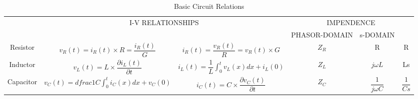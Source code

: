  \begin{table}[h]
	
	\begin{center}
			\begin{tabular}{cccccc}
				\toprule 
				\multirow{1}{*}{}	& \multicolumn{2}{c}{\multirow{ 2}{*}{I-V RELATIONSHIPS}} &	\multicolumn{3}{c}{IMPENDENCE}  \\ \cline{4-6}
				& &	&  PHASOR-DOMAIN & s-DOMAIN & \\ \hline
				Resistor	& $v_R(t)=i_R(t) \times R=\dfrac{i_R(t)}{G}$& $i_R(t)=\dfrac{v_R(t)}{R}=v_R(t) \times G$& $ Z_R $ & R & R\\ \hline
				Inductor	& $v_L(t)=L\times \dfrac{ \partial i_L(t)}{\partial t} $& $i_L(t)=\dfrac{1}{L} \int_{0}^{t} v_L(x)dx+ i_L(0)$& $ Z_L $ &$ j\omega L$ & Ls\\ \hline
				Capacitor	& $v_C(t)=dfrac{1}{C}\int_{0}^{t} i_C(x)dx+ v_C(0)$& $i_C(t)=C\times \dfrac{\partial v_C(t)}{\partial t} $& $ Z_C $ & $ \dfrac{1}{j\omega C} $& $\dfrac{1}{Cs}$\\ 
				\bottomrule
			\end{tabular}
		\caption{Basic Circuit Relations}
	\end{center}
\end{table}

